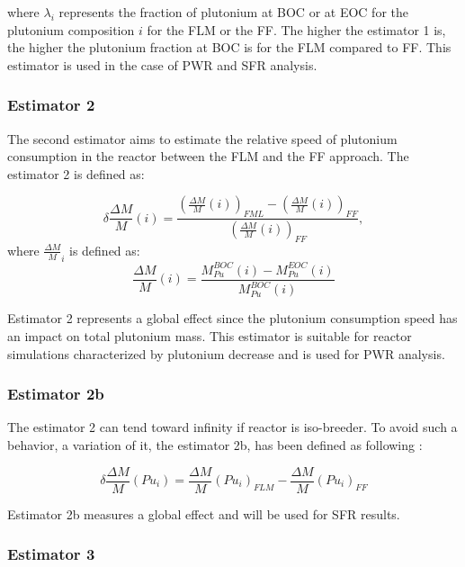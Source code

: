 where $\lambda_i$ represents the fraction of plutonium at \gls{BOC} or at
\gls{EOC} for the plutonium composition $i$ for the \gls{FLM} or the \gls{FF}.
The higher the estimator 1 is, the higher the plutonium fraction at \gls{BOC} is
for the \gls{FLM} compared to \gls{FF}. This estimator is used in the case of
\gls{PWR} and \gls{SFR} analysis.

\subsubsection{Estimator 2}

The second estimator aims to estimate the relative speed of plutonium
consumption in the reactor between the \gls{FLM} and the \gls{FF} approach. The
estimator 2 is defined as:

\begin{equation}
    \delta{\frac{\Delta M}{M}}(i) =
        \frac{\left(\frac{\Delta M}{M}(i)\right)_{FML}
              - \left(\frac{\Delta M}{M}(i)\right)_{FF}}
             {\left(\frac{\Delta M}{M}(i)\right)_{FF}},
\end{equation}
where $\frac{\Delta M}{M}_{i}$ is defined as:
\begin{equation}
    \frac{\Delta M}{M}(i) = \frac{M_{Pu}^{BOC}(i) -
    M_{Pu}^{EOC}(i)}{M_{Pu}^{BOC}(i)}
\end{equation}

Estimator 2 represents a global effect since the plutonium consumption speed has
an impact on total plutonium mass. This estimator is suitable for reactor
simulations characterized by plutonium decrease and is used for \gls{PWR} analysis.

\subsubsection{Estimator 2b}

The estimator 2 can tend toward infinity if reactor is iso-breeder. To avoid
such a behavior, a variation of it, the estimator 2b, has been defined as following : 

\begin{equation}
    \delta \frac{\Delta M}{M}(Pu_i) = \frac{\Delta M}{M}(Pu_i)_{FLM} - \frac{\Delta M}{M}(Pu_i)_{FF}
\end{equation}

Estimator 2b measures a global effect and will be used for \gls{SFR} results.

\subsubsection{Estimator 3}

